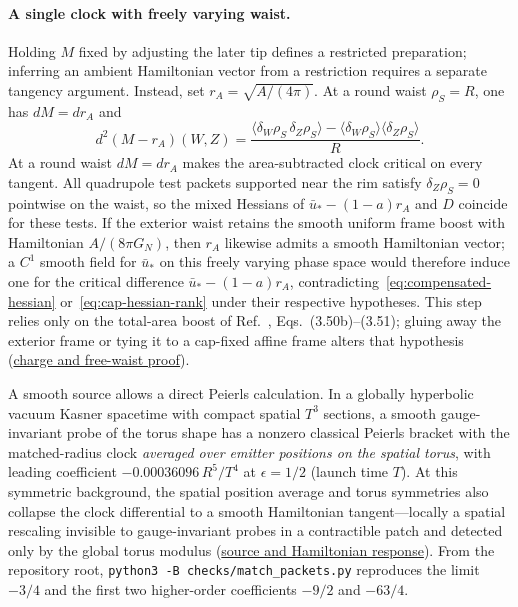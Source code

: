 \documentclass[10pt,a4paper]{article}
\numberwithin{equation}{section}
\newcommand{\repo}[2]{\href{https://github.com/sprajs/quantum-gravity/blob/main/#1}{#2}}
\begin{document}
\paragraph{A single clock with freely varying waist.}
Holding $M$ fixed by adjusting the later tip defines a restricted preparation; inferring an ambient Hamiltonian vector from a restriction requires a separate tangency argument. Instead, set $r_A=\sqrt{A/(4\pi)}$. At a round waist $\rho_S=R$, one has $dM=dr_A$ and
\begin{equation}
 d^2(M-r_A)(W,Z)=\frac{\langle\delta_W\rho_S\,\delta_Z\rho_S\rangle
       -\langle\delta_W\rho_S\rangle\langle\delta_Z\rho_S\rangle}{R}.
\end{equation}
At a round waist $dM=dr_A$ makes the area-subtracted clock critical on every tangent. All quadrupole test packets supported near the rim satisfy $\delta_Z\rho_S=0$ pointwise on the waist, so the mixed Hessians of $\bar u_*-(1-a)r_A$ and $D$ coincide for these tests. If the exterior waist retains the smooth uniform frame boost with Hamiltonian $A/(8\pi G_N)$, then $r_A$ likewise admits a smooth Hamiltonian vector; a $C^1$ smooth field for $\bar u_*$ on this freely varying phase space would therefore induce one for the critical difference $\bar u_*-(1-a)r_A$, contradicting~\eqref{eq:compensated-hessian} or~\eqref{eq:cap-hessian-rank} under their respective hypotheses. This step relies only on the total-area boost of Ref.~\cite{Chandrasekaran2026}, Eqs.~(3.50b)--(3.51); gluing away the exterior frame or tying it to a cap-fixed affine frame alters that hypothesis (\repo{audit/match-area.md}{charge and free-waist proof}).

A smooth source allows a direct Peierls calculation. In a globally hyperbolic vacuum Kasner spacetime with compact spatial $T^3$ sections, a smooth gauge-invariant probe of the torus shape has a nonzero classical Peierls bracket with the matched-radius clock \emph{averaged over emitter positions on the spatial torus}, with leading coefficient $-0.00036096\,R^5/T^4$ at $\epsilon=1/2$ (launch time $T$).
At this symmetric background, the spatial position average and torus symmetries also collapse the clock differential to a smooth Hamiltonian tangent---locally a spatial rescaling invisible to gauge-invariant probes in a contractible patch and detected only by the global torus modulus (\repo{audit/joint-jacobi.md}{source and Hamiltonian response}).
From the repository root, \texttt{python3 -B checks/match\_packets.py} reproduces the limit $-3/4$ and the first two higher-order coefficients $-9/2$ and $-63/4$.
\end{document}
